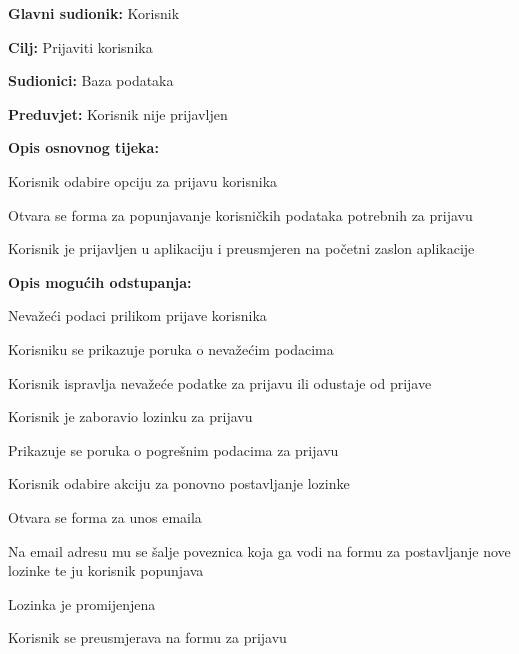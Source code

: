 \noindent {}
\begin{packed_item}

	\item \textbf{Glavni sudionik:} Korisnik
	\item \textbf{Cilj:} Prijaviti korisnika
	\item \textbf{Sudionici:} Baza podataka
	\item \textbf{Preduvjet:} Korisnik nije prijavljen
	\item \textbf{Opis osnovnog tijeka:}
	
	\item[] \begin{packed_enum}
		
		\item Korisnik odabire opciju za prijavu korisnika
		\item Otvara se forma za popunjavanje korisničkih podataka potrebnih za prijavu
		\item Korisnik je prijavljen u aplikaciju i preusmjeren na početni zaslon aplikacije

	\end{packed_enum}

	\item  \textbf{Opis mogućih odstupanja:}
	
	\item[] \begin{packed_item}
	
		\item[2.a] Nevažeći podaci prilikom prijave korisnika
		\item[] \begin{packed_enum}
			
			\item Korisniku se prikazuje poruka o nevažećim podacima
			\item Korisnik ispravlja nevažeće podatke za prijavu ili odustaje od prijave
			
		\end{packed_enum}
		
		\item[2.b] Korisnik je zaboravio lozinku za prijavu
		\item[] \begin{packed_enum}
			
			\item Prikazuje se poruka o pogrešnim podacima za prijavu 
			\item Korisnik odabire akciju za ponovno postavljanje lozinke
			\item Otvara se forma za unos emaila
			\item Na email adresu mu se šalje poveznica koja ga vodi na formu za postavljanje nove lozinke te ju korisnik popunjava
			\item Lozinka je promijenjena
			\item Korisnik se preusmjerava na formu za prijavu
			
		\end{packed_enum}

	\end{packed_item}
\end{packed_item}

